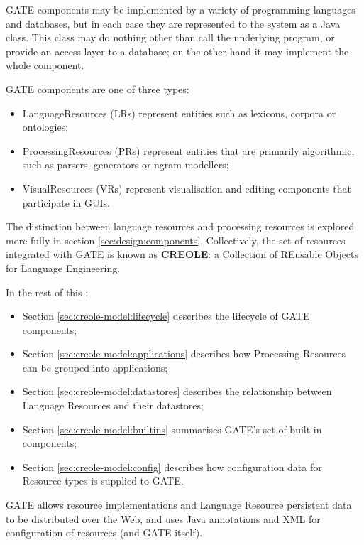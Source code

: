 GATE components may be implemented by a variety of programming languages and
databases, but in each case they are represented to the system as a Java
class. This class may do nothing other than call the underlying program, or
provide an access layer to a database; on the other hand
it may implement the whole component.

GATE components are one of three types:
%
\begin{itemize}
%
\item
LanguageResources (LRs) represent entities such as lexicons, corpora or
ontologies;
%
\item
ProcessingResources (PRs) represent entities that are primarily algorithmic,
such as parsers, generators or ngram modellers;
%
\item
VisualResources (VRs) represent visualisation and editing components that
participate in GUIs.
%
\end{itemize}
%
\ifprintedbook
\else
The distinction between language resources and processing resources is explored more fully in section \ref{sec:design:components}.
\fi
Collectively, the set of resources integrated with GATE is known as
{\bf CREOLE}: a
Collection of REusable Objects for Language Engineering.

In the rest of this \chapthing:
\begin{itemize}
\item
Section \ref{sec:creole-model:lifecycle} describes the lifecycle of GATE
components;
\item
Section \ref{sec:creole-model:applications} describes how Processing Resources
can be grouped into applications;
\item
Section \ref{sec:creole-model:datastores} describes the relationship between
Language Resources and their datastores;
\item
Section \ref{sec:creole-model:builtins} summarises GATE's set of built-in
components;
\item
Section \ref{sec:creole-model:config} describes how configuration data for
Resource types is supplied to GATE.
\end{itemize}



GATE allows resource implementations and Language Resource persistent data to
be distributed over the Web, and uses Java annotations and XML for
configuration of resources (and GATE itself).

